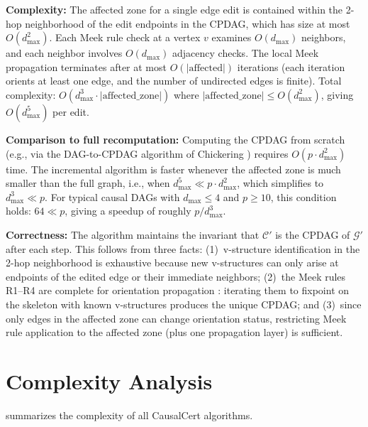 \documentclass[11pt,a4paper]{article}
\theoremstyle{definition}
\theoremstyle{remark}
\newcommand{\DAG}{\mathcal{G}}
\begin{document}
\noindent\textbf{Complexity:} The affected zone for a single edge edit is contained
within the 2-hop neighborhood of the edit endpoints in the CPDAG, which has size at
most $O(d_{\max}^2)$. Each Meek rule check at a vertex $v$ examines $O(d_{\max})$
neighbors, and each neighbor involves $O(d_{\max})$ adjacency checks. The local Meek
propagation terminates after at most $O(|\mathrm{affected}|)$ iterations (each iteration
orients at least one edge, and the number of undirected edges is finite). Total
complexity: $O(d_{\max}^3 \cdot |\mathrm{affected\_zone}|)$ where
$|\mathrm{affected\_zone}| \leq O(d_{\max}^2)$, giving $O(d_{\max}^5)$ per edit.

\smallskip
\noindent\textbf{Comparison to full recomputation:} Computing the CPDAG from scratch
(e.g., via the DAG-to-CPDAG algorithm of Chickering \cite{chickering2002}) requires
$O(p \cdot d_{\max}^2)$ time. The incremental algorithm is faster whenever the affected
zone is much smaller than the full graph, i.e., when $d_{\max}^5 \ll p \cdot d_{\max}^2$,
which simplifies to $d_{\max}^3 \ll p$. For typical causal DAGs with $d_{\max} \leq 4$
and $p \geq 10$, this condition holds: $64 \ll p$, giving a speedup of roughly
$p / d_{\max}^3$.

\smallskip
\noindent\textbf{Correctness:} The algorithm maintains the invariant that $\mathcal{C}'$
is the CPDAG of $\DAG'$ after each step. This follows from three facts:
(1)~v-structure identification in the 2-hop neighborhood is exhaustive because new
v-structures can only arise at endpoints of the edited edge or their immediate neighbors;
(2)~the Meek rules R1--R4 are complete for orientation propagation
\cite{meek1995}: iterating them to fixpoint on the skeleton with known v-structures
produces the unique CPDAG; and (3)~since only edges in the affected zone can change
orientation status, restricting Meek rule application to the affected zone (plus one
propagation layer) is sufficient.




\section{Complexity Analysis}\label{sec:complexity}

 summarizes the complexity of all CausalCert algorithms.
\end{document}
